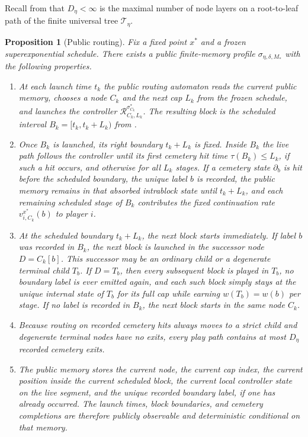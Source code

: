 \documentclass[12pt]{article}
\newtheorem{proposition}[theorem]{Proposition}
\theoremstyle{definition}
\newcommand{\1}{\mathbf{1}}
\newcommand{\cT}{\mathcal{T}}
\begin{document}
Recall from  that $D_\eta<\infty$ is the maximal number of
node layers on a root-to-leaf path of the finite universal tree $\cT_\eta$.

\begin{proposition}[Public routing]
\label{prop:public-routing}
Fix a fixed point $x^*$ and a frozen superexponential schedule. There exists a
public finite-memory profile $\sigma_{\eta,\delta,M_*}$ with the following
properties.
\begin{enumerate}[label=\textnormal{(R\arabic*)},leftmargin=2.8em]
\item At each launch time $t_k$ the public routing automaton reads the current
public memory, chooses a node $C_k$ and the next cap $L_k$ from the frozen
schedule, and launches the controller $\mathcal R_{C_k,L_k}^{\sigma_{C_k}^*}$.
The resulting block is the scheduled interval $B_k=[t_k,t_k+L_k)$ from
.
\item Once $B_k$ is launched, its right boundary $t_k+L_k$ is fixed. Inside $B_k$
the live path follows the controller until its first cemetery hit time
$\tau(B_k)\le L_k$, if such a hit occurs, and otherwise for all $L_k$ stages. If
a cemetery state $\partial_b$ is hit before the scheduled boundary, the unique
label $b$ is recorded, the public memory remains in that absorbed intrablock
state until $t_k+L_k$, and each remaining scheduled stage of $B_k$ contributes
the fixed continuation rate $v_{i,C_k}^{x^*}(b)$ to player $i$.
\item At the scheduled boundary $t_k+L_k$, the next block starts immediately. If
label $b$ was recorded in $B_k$, the next block is launched in the successor node
$D=C_k[b]$. This successor may be an ordinary child or a degenerate terminal
child $T_b$. If $D=T_b$, then every subsequent block is played in $T_b$, no
boundary label is ever emitted again, and each such block simply stays at the
unique internal state of $T_b$ for its full cap while earning $w(T_b)=w(b)$ per
stage. If no label is recorded in $B_k$, the next block starts in the same node
$C_k$.
\item Because routing on recorded cemetery hits always moves to a strict child and
degenerate terminal nodes have no exits, every play path contains at most
$D_\eta$ recorded cemetery exits.
\item The public memory stores the current node, the current cap index, the
current position inside the current scheduled block, the current local controller
state on the live segment, and the unique recorded boundary label, if one has
already occurred. The launch times, block boundaries, and cemetery completions are
therefore publicly observable and deterministic conditional on that memory.
\end{enumerate}
\end{proposition}
\end{document}
